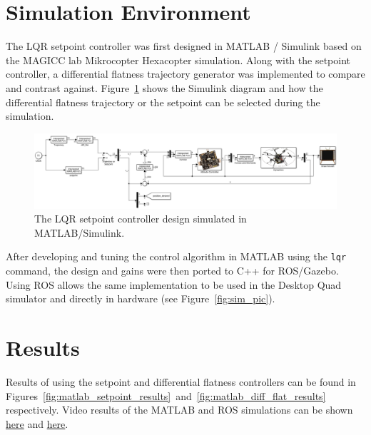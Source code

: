 \documentclass[12pt]{article}
\begin{document}

\section{Simulation Environment}

The LQR setpoint controller was first designed in MATLAB / Simulink based on the MAGICC lab Mikrocopter Hexacopter simulation. Along with the setpoint controller, a differential flatness \cite{Ferrin2011} trajectory generator was implemented to compare and contrast against. Figure~\ref{fig:matlab_hex_sim} shows the Simulink diagram and how the differential flatness trajectory or the setpoint can be selected during the simulation.

\begin{figure}[H]
	\centering
	\includegraphics[scale=0.28]{hex_sim}
	\caption{The LQR setpoint controller design simulated in MATLAB/Simulink.}
	\label{fig:matlab_hex_sim}
\end{figure}

After developing and tuning the control algorithm in MATLAB using the \texttt{lqr} command, the design and gains were then ported to C++ for ROS/Gazebo. Using ROS allows the same implementation to be used in the Desktop Quad simulator and directly in hardware (see Figure~\ref{fig:sim_pic}).

\section{Results}

Results of using the setpoint and differential flatness controllers can be found in Figures~\ref{fig:matlab_setpoint_results}~and~\ref{fig:matlab_diff_flat_results} respectively. Video results of the MATLAB and ROS simulations can be shown \href{https://youtu.be/hX0MF_FHCtE}{here} and \href{https://youtu.be/GLhXQmhUx8w}{here}.
\end{document}
